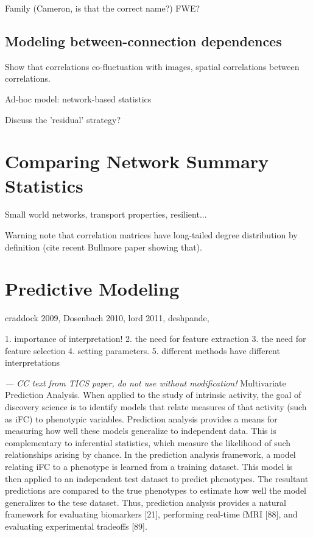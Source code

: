 \documentclass[5p]{elsarticle}
\begin{document}
Family (Cameron, is that the correct name?) FWE?

\subsection{Modeling between-connection dependences}

Show that correlations co-fluctuation with images, spatial correlations between correlations.

Ad-hoc model: network-based statistics \cite{zalesky2010}

Discuss the 'residual' strategy?
\cite{varoquaux2010b}


\section{Comparing Network Summary Statistics}

Small world networks, transport properties, resilient...

Warning note that correlation matrices have long-tailed degree
distribution by definition (cite recent Bullmore paper showing that).


\section{Predictive Modeling}
craddock 2009, Dosenbach 2010, lord 2011, deshpande, 

1. importance of interpretation!
2. the need for feature extraction
3. the need for feature selection
4. setting parameters.
5. different methods have different interpretations

\emph{ --- CC text from TICS paper, do not use without modification!}
Multivariate Prediction Analysis. When applied to the study of intrinsic activity, the goal of discovery
science is to identify models that relate measures of that activity (such as iFC) to phenotypic variables.
Prediction analysis provides a means for measuring how well these models generalize to independent data.
This is complementary to inferential statistics, which measure the likelihood of such relationships
arising by chance. In the prediction analysis framework, a model relating iFC to a phenotype is learned 
from a training dataset. This model is then applied to an independent test dataset to predict phenotypes.
The resultant predictions are compared to the true phenotypes to estimate how well the model generalizes
to the tese dataset. Thus, prediction analysis provides a natural framework for evaluating biomarkers [21],
performing real-time fMRI [88], and evaluating experimental tradeoffs [89]. 
\end{document}
